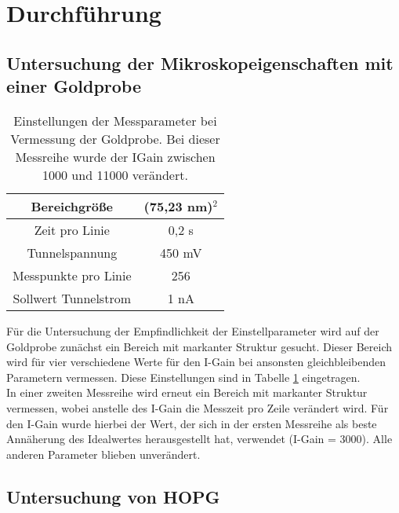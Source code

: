 \documentclass[12pt,a4paper]{article}
\begin{document}



\section{Durchführung}
\subsection{Untersuchung der Mikroskopeigenschaften mit einer Goldprobe}

\begin{table}
\centering
\begin{tabular}{|c|c|}
\hline 
Bereichgröße & (75,23 nm)$^2$ \\ 
\hline 
Zeit pro Linie & 0,2 s \\
\hline 
Tunnelspannung & 450 mV \\ 
\hline 
Messpunkte pro Linie & 256 \\
\hline 
Sollwert Tunnelstrom & 1 nA \\
\hline 
\end{tabular} 
\caption{Einstellungen der Messparameter bei Vermessung der Goldprobe. Bei dieser Messreihe wurde der IGain zwischen 1000 und 11000 verändert.}
\label{tab:IGain_Einstellungen}
\end{table}

Für die Untersuchung der Empfindlichkeit der Einstellparameter wird auf der Goldprobe zunächst ein Bereich mit markanter Struktur gesucht. Dieser Bereich wird für vier verschiedene Werte für den I-Gain bei ansonsten gleichbleibenden Parametern vermessen. Diese Einstellungen sind in Tabelle \ref{tab:IGain_Einstellungen} eingetragen.\\
In einer zweiten Messreihe wird erneut ein Bereich mit markanter Struktur vermessen, wobei anstelle des I-Gain die Messzeit pro Zeile verändert wird. Für den I-Gain wurde hierbei der Wert, der sich in der ersten Messreihe als beste Annäherung des Idealwertes herausgestellt hat, verwendet (I-Gain = 3000). Alle anderen Parameter blieben unverändert.

\subsection{Untersuchung von HOPG}
\end{document}
